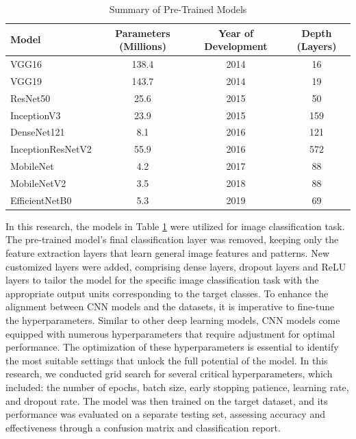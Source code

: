 \documentclass[11pt]{article}
\begin{document}
\begin{table}[H]
    \centering
    \caption{Summary of Pre-Trained Models}\label{tab:summary_pretrained}
    \begin{tabular}{l c c c}
        \toprule
        \textbf{Model} & \textbf{Parameters (Millions)} & \textbf{Year of Development} & \textbf{Depth (Layers)} \\
        \midrule
        VGG16 \citep{simonyan2014very} & 138.4 & 2014 & 16 \\
        VGG19 \citep{simonyan2014very} & 143.7 & 2014 & 19 \\
        ResNet50 \citep{he2016deep} & 25.6 & 2015 & 50 \\
        InceptionV3 \citep{szegedy2016rethinking} & 23.9 & 2015 & 159 \\
        DenseNet121 \citep{huang2017densely} & 8.1 & 2016 & 121 \\
        InceptionResNetV2 \citep{szegedy2017inception} & 55.9 & 2016 & 572 \\
        MobileNet \citep{howard2017mobilenets} & 4.2 & 2017 & 88 \\
        MobileNetV2 \citep{sandler2018mobilenetv2} & 3.5 & 2018 & 88 \\
        EfficientNetB0 \citep{tan2019efficientnet} & 5.3 & 2019 & 69 \\
        \bottomrule
    \end{tabular}
\end{table}

In this research, the models in Table \ref{tab:summary_pretrained} were utilized for image classification task. The pre-trained model's final classification layer was removed, keeping only the feature extraction layers that learn general image features and patterns. New customized layers were added, comprising dense layers, dropout layers and ReLU layers to tailor the model for the specific image classification task with the appropriate output units corresponding to the target classes. To enhance the alignment between CNN models and the datasets, it is imperative to fine-tune the hyperparameters. Similar to other deep learning models, CNN models come equipped with numerous hyperparameters that require adjustment for optimal performance. The optimization of these hyperparameters is essential to identify the most suitable settings that unlock the full potential of the model. In this research, we conducted grid search for several critical hyperparameters, which included: the number of epochs, batch size, early stopping patience, learning rate, and dropout rate. The model was then trained on the target dataset, and its performance was evaluated on a separate testing set, assessing accuracy and effectiveness through a confusion matrix and classification report. 
\end{document}
